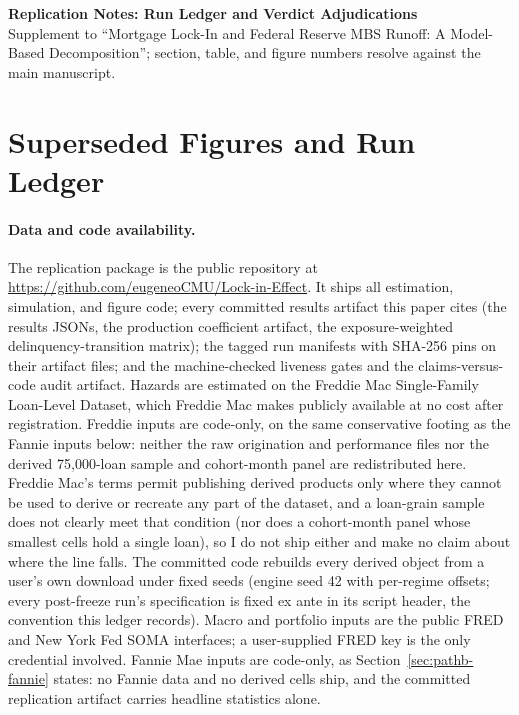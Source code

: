 \documentclass[12pt]{article}
\renewcommand{\thesection}{\Roman{section}}
\begin{document}
\begin{center}\Large\textbf{Replication Notes: Run Ledger and Verdict Adjudications}\\[4pt]\normalsize Supplement to ``Mortgage Lock-In and Federal Reserve MBS Runoff: A Model-Based Decomposition''; section, table, and figure numbers resolve against the main manuscript.\end{center}

\appendix
\renewcommand{\thesection}{L\arabic{section}}

\section{Superseded Figures and Run Ledger}\label{app:ledger}

\paragraph{Data and code availability.} The replication package is the public repository at \url{https://github.com/eugeneoCMU/Lock-in-Effect}. It ships all estimation, simulation, and figure code; every committed results artifact this paper cites (the results JSONs, the production coefficient artifact, the exposure-weighted delinquency-transition matrix); the tagged run manifests with SHA-256 pins on their artifact files; and the machine-checked liveness gates and the claims-versus-code audit artifact. Hazards are estimated on the Freddie Mac Single-Family Loan-Level Dataset, which Freddie Mac makes publicly available at no cost after registration. Freddie inputs are code-only, on the same conservative footing as the Fannie inputs below: neither the raw origination and performance files nor the derived 75{,}000-loan sample and cohort-month panel are redistributed here. Freddie Mac's terms permit publishing derived products only where they cannot be used to derive or recreate any part of the dataset, and a loan-grain sample does not clearly meet that condition (nor does a cohort-month panel whose smallest cells hold a single loan), so I do not ship either and make no claim about where the line falls. The committed code rebuilds every derived object from a user's own download under fixed seeds (engine seed 42 with per-regime offsets; every post-freeze run's specification is fixed ex ante in its script header, the convention this ledger records). Macro and portfolio inputs are the public FRED and New York Fed SOMA interfaces; a user-supplied FRED key is the only credential involved. Fannie Mae inputs are code-only, as Section~\ref{sec:pathb-fannie} states: no Fannie data and no derived cells ship, and the committed replication artifact carries headline statistics alone.
\end{document}
